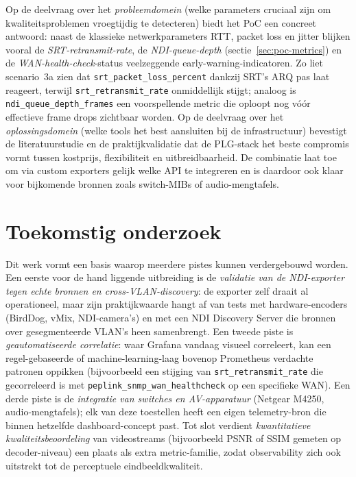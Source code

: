 Op de deelvraag over het \emph{probleemdomein} (welke parameters cruciaal zijn om kwaliteitsproblemen vroegtijdig te detecteren) biedt het PoC een concreet antwoord: naast de klassieke netwerkparameters RTT, packet loss en jitter blijken vooral de \emph{SRT-retransmit-rate}, de \emph{NDI-queue-depth} (sectie~\ref{sec:poc-metrics}) en de \emph{WAN-health-check}-status veelzeggende early-warning-indicatoren. Zo liet scenario~3a zien dat \texttt{srt\_packet\_loss\_percent} dankzij SRT's ARQ pas laat reageert, terwijl \texttt{srt\_retransmit\_rate} onmiddellijk stijgt; analoog is \texttt{ndi\_queue\_depth\_frames} een voorspellende metric die oploopt nog vóór effectieve frame drops zichtbaar worden. Op de deelvraag over het \emph{oplossingsdomein} (welke tools het best aansluiten bij de infrastructuur) bevestigt de literatuurstudie en de praktijkvalidatie dat de PLG-stack het beste compromis vormt tussen kostprijs, flexibiliteit en uitbreidbaarheid. De combinatie laat toe om via custom exporters gelijk welke API te integreren en is daardoor ook klaar voor bijkomende bronnen zoals switch-MIBs of audio-mengtafels.

\section{Toekomstig onderzoek}
\label{sec:conclusie-toekomst}

Dit werk vormt een basis waarop meerdere pistes kunnen verdergebouwd worden. Een eerste voor de hand liggende uitbreiding is de \emph{validatie van de NDI-exporter tegen echte bronnen en cross-VLAN-discovery}: de exporter zelf draait al operationeel, maar zijn praktijkwaarde hangt af van tests met hardware-encoders (BirdDog, vMix, NDI-camera's) en met een NDI Discovery Server die bronnen over gesegmenteerde VLAN's heen samenbrengt. Een tweede piste is \emph{geautomatiseerde correlatie}: waar Grafana vandaag visueel correleert, kan een regel-gebaseerde of machine-learning-laag bovenop Prometheus verdachte patronen oppikken (bijvoorbeeld een stijging van \texttt{srt\_retransmit\_rate} die gecorreleerd is met \texttt{peplink\_snmp\_wan\_healthcheck} op een specifieke WAN). Een derde piste is de \emph{integratie van switches en AV-apparatuur} (Netgear M4250, audio-mengtafels); elk van deze toestellen heeft een eigen telemetry-bron die binnen hetzelfde dashboard-concept past. Tot slot verdient \emph{kwantitatieve kwaliteitsbeoordeling} van videostreams (bijvoorbeeld PSNR of SSIM gemeten op decoder-niveau) een plaats als extra metric-familie, zodat observability zich ook uitstrekt tot de perceptuele eindbeeldkwaliteit.

